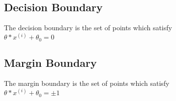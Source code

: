 \subsection{Decision Boundary}
The decision boundary is the set of points  which satisfy \\
$\theta*x^{(i)}+\theta_{0} = 0$


\subsection{Margin Boundary}
The margin boundary is the set of points  which satisfy \\
$\theta*x^{(i)}+\theta_{0} = \pm 1$
